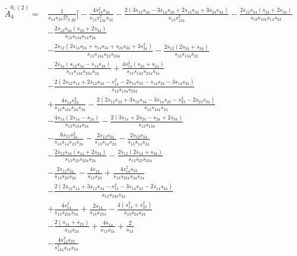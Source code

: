 \begin{align}
    \tilde A_4^{0,(2)} = {}
        & \frac{1}{s_{14}s_{23}\mathcal D_{4,gg}}\Bigg[-\frac{4s_{14}^{2}s_{24}}
{s_{13}s_{134}^{2}s_{34}}
-\frac{2\left(
3s_{12}s_{34}-3s_{14}s_{23}
+2s_{14}s_{24}+3s_{24}s_{34}
\right)}
{s_{13}s_{134}^{2}}
-\frac{2s_{12}s_{34}(s_{24}+2s_{34})}
{s_{13}s_{134}s_{14}s_{23}} \nonumber \\
&-\frac{2s_{12}s_{34}(s_{23}+2s_{34})}
{s_{13}s_{134}s_{14}s_{24}}
 \nonumber \\
&-\frac{2s_{12}\left(
2s_{14}s_{24}+s_{14}s_{34}
+s_{24}s_{34}+3s_{34}^{2}
\right)}
{s_{13}s_{134}s_{23}s_{234}}
-\frac{2s_{12}(2s_{24}+s_{34})}
{s_{13}s_{134}s_{23}}
 \nonumber \\
&-\frac{2s_{34}(s_{12}s_{34}-s_{14}s_{23})}
{s_{13}s_{134}s_{234}s_{24}}
+\frac{4s_{14}^{2}(s_{23}+s_{24})}
{s_{13}s_{134}s_{234}s_{34}}
 \nonumber \\
&-\frac{2\left(
2s_{12}s_{14}+2s_{12}s_{34}
-s_{14}^{2}-2s_{14}s_{23}
-s_{14}s_{24}-3s_{14}s_{34}
\right)}
{s_{13}s_{134}s_{234}}
 \nonumber \\
&+\frac{4s_{14}s_{23}^{2}}
{s_{13}s_{134}s_{24}s_{34}}
-\frac{2\left(
2s_{12}s_{23}+3s_{12}s_{34}
-3s_{14}s_{23}-s_{23}^{2}
-2s_{23}s_{34}
\right)}
{s_{13}s_{134}s_{24}}
 \nonumber \\
&-\frac{4s_{14}(2s_{14}-s_{24})}
{s_{13}s_{134}s_{34}}
-\frac{2(3s_{14}+2s_{23}-s_{24}+2s_{34})}
{s_{13}s_{134}}
 \nonumber \\
&-\frac{6s_{12}s_{34}^{2}}
{s_{13}s_{14}s_{23}s_{24}}
-\frac{2s_{12}s_{34}}
{s_{13}s_{14}s_{23}}
-\frac{2s_{12}s_{34}}
{s_{13}s_{14}s_{24}}
 \nonumber \\
&-\frac{2s_{12}s_{34}(s_{14}+2s_{34})}
{s_{13}s_{23}s_{234}s_{24}}
-\frac{2s_{12}(2s_{14}+s_{34})}
{s_{13}s_{23}s_{234}}
 \nonumber \\
&-\frac{2s_{12}s_{34}}
{s_{13}s_{23}s_{24}}
-\frac{4s_{12}}{s_{13}s_{23}}
+\frac{4s_{14}^{2}s_{23}}
{s_{13}s_{234}s_{24}s_{34}}
 \nonumber \\
&-\frac{2\left(
2s_{12}s_{14}+3s_{12}s_{34}
-s_{14}^{2}-3s_{14}s_{23}
-2s_{14}s_{34}
\right)}
{s_{13}s_{234}s_{24}}
 \nonumber \\
&+\frac{4s_{14}^{2}}
{s_{13}s_{234}s_{34}}
+\frac{2s_{14}}{s_{13}s_{234}}
-\frac{4(s_{14}^{2}+s_{23}^{2})}
{s_{13}s_{24}s_{34}}
 \nonumber \\
&-\frac{2(s_{14}+s_{23})}
{s_{13}s_{24}}
+\frac{4s_{14}}{s_{13}s_{34}}
+\frac{2}{s_{13}}
 \nonumber \\[1mm]
&-\frac{4s_{13}^{2}s_{23}}
{s_{134}^{2}s_{14}s_{34}}

\end{align}
